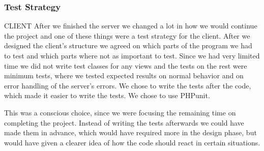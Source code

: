 \subsubsection{Test Strategy}
CLIENT
After we finished the server we changed a lot in how we would continue the project and one of these things were a test strategy for the client. After we designed the client's structure we agreed on which parts of the program we had to test and which parts where not as important to test. Since we had very limited time we did not write test classes for any views and the tests on the rest were minimum tests, where we tested expected results on normal behavior and on error handling of the server's errors. We chose to write the tests after the code, which made it easier to write the tests. We chose to use PHPunit.

This was a conscious choice, since we were focusing the remaining time on completing the project. Instead of writing the tests afterwards we could have made them in advance, which would have required more in the design phase, but would have given a clearer idea of how the code should react in certain situations.